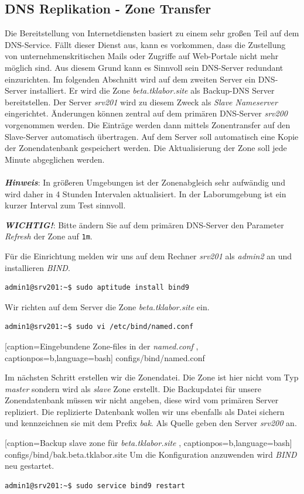 \subsection{DNS Replikation - Zone Transfer}
Die Bereitstellung von Internetdiensten basiert zu einem sehr großen Teil auf
dem DNS-Service. Fällt dieser Dienst aus, kann es vorkommen, dass die Zustellung
von unternehmenskritischen Mails oder Zugriffe auf Web-Portale nicht mehr
möglich sind. Aus diesem Grund kann es Sinnvoll sein DNS-Server redundant
einzurichten. Im folgenden Abschnitt wird auf dem zweiten Server ein DNS-Server
installiert. Er wird die Zone \textit{beta.tklabor.site} als Backup-DNS Server
bereitstellen. Der Server \textit{srv201} wird zu diesem Zweck als \textit{Slave
Nameserver} eingerichtet. Änderungen können zentral auf dem primären DNS-Server
\textit{srv200} vorgenommen werden. Die Einträge werden dann mittels
Zonentransfer auf den Slave-Server automatisch übertragen. Auf dem Server soll
automatisch eine Kopie der Zonendatenbank gespeichert werden. Die Aktualisierung
der Zone soll jede Minute abgeglichen werden.\\
\\
\textbf{\textit{Hinweis}}: In größeren Umgebungen ist der Zonenabgleich sehr
aufwändig und wird daher in 4 Stunden Intervalen aktualisiert. In der
Laborumgebung ist ein kurzer Interval zum Test sinnvoll.

\textbf{\textit{WICHTIG!}}: Bitte ändern Sie auf dem primären DNS-Server den
Parameter \textit{Refresh} der Zone auf \texttt{1m}. 

Für die Einrichtung melden wir uns auf dem Rechner \textit{srv201} als
\textit{admin2} an und installieren \textit{BIND}.
\begin{lstlisting}
admin1@srv201:~$ sudo aptitude install bind9
\end{lstlisting}
Wir richten auf dem Server die Zone \textit{beta.tklabor.site} ein.
\begin{lstlisting}
admin1@srv201:~$ sudo vi /etc/bind/named.conf
\end{lstlisting}

    [caption={Eingebundene Zone-files in der \textit{named.conf}}
       \label{lst:named.conf},
       captionpos=b,language=bash]
{configs/bind/named.conf}

Im nächsten Schritt erstellen wir die Zonendatei. Die Zone ist hier nicht vom
Typ \textit{master} sondern wird als \textit{slave} Zone erstellt. Die
Backupdatei für unsere Zonendatenbank müssen wir nicht angeben, diese wird vom
primären Server repliziert. Die replizierte Datenbank wollen wir uns ebenfalls
als Datei sichern und kennzeichnen sie mit dem Prefix \textit{bak}. Als Quelle
geben den Server \textit{srv200} an.

    [caption={Backup slave zone für \textit{beta.tklabor.site}}
       \label{lst:back.beta.tklabor.site},
       captionpos=b,language=bash]
{configs/bind/bak.beta.tklabor.site}
Um die Konfiguration anzuwenden wird \textit{BIND} neu gestartet.
\begin{lstlisting}
admin1@srv201:~$ sudo service bind9 restart
\end{lstlisting}

